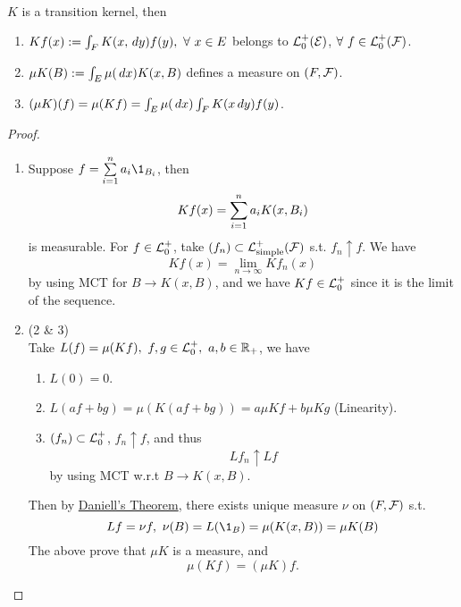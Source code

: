\vspace{6pt}
\begin{proposition}\ \\
$K$ is a transition kernel, then 
\begin{enumerate}[label = (\arabic*)]
    \item $K f(x) := \int_F K(x, \dr y) f(y),\ \forall\ x \in E$ belongs to $\mathcal{L}_0^+(\mathcal{E})$, $\forall\ f \in \mathcal{L}_0^+ (\mathcal{F})$.
    \item $\mu K(B) := \int_E \mu(\,dx) K(x, B)$ defines a measure on $(F,\mathcal{F})$.
    \item $(\mu K)(f) = \mu(Kf) = \int_E \mu(\,dx) \int_F K(x \,dy) f(y)$.
\end{enumerate}
\end{proposition}
\begin{proof}\ 
\begin{enumerate}[label = (\arabic*)]
    \item Suppose $f = \summ{i=1}{n} a_i \1_{B_i}$, then
    \begin{equation*}
        Kf(x) = \sum\limits_{i = 1}^n a_i K(x, B_i)
    \end{equation*}
    is measurable. For $f \in \mathcal{L}_0^+$, take $(f_n) \subset \mathcal{L}_{\text{simple}}^+ (\mathcal{F})$ s.t. $f_n \uparrow f$. We have
    \begin{equation*}
        Kf(x) = \lim_{n \to \infty} Kf_n(x)
    \end{equation*}
    by using MCT for $B \to K(x,B)$, and we have $Kf \in \mathcal{L}_0^+$ since it is the limit of the sequence.
    \item (2 \& 3)\\
    Take $L(f) = \mu(Kf),\ f,g \in \mathcal{L}_0^+,\ a,b \in \mathbb{R}_+$, we have
    \begin{enumerate}[label = (\alph*)]
        \item $L(0) = 0$.
        \item $L(af + bg) = \mu(K(af + bg)) = a \mu K f + b \mu K g$ (Linearity).
        \item $(f_n) \subset \mathcal{L}_0^+$, $f_n \uparrow f$, and thus
        \begin{equation*}
            Lf_n \uparrow Lf
        \end{equation*}
        by using MCT w.r.t $B \to K(x,B)$.
    \end{enumerate}
    Then by \hyperref[Daniell's Theorem]{Daniell's Theorem}, there exists unique measure $\nu$ on $(F,\mathcal{F})$ s.t.
        \begin{equation*}
            Lf = \nu f,\ \nu(B) = L(\1_B) = \mu(K(x,B)) = \mu K(B) 
        \end{equation*}
    The above prove that $\mu K$ is a measure, and
  \begin{equation*}
      \mu(Kf) = (\mu K) f.
  \end{equation*}
\end{enumerate}
\end{proof}



